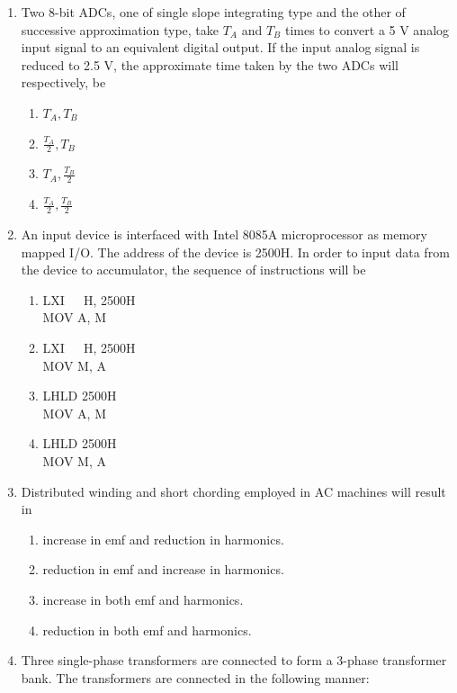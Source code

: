 \documentclass[journal]{IEEEtran}
\begin{document}
\begin{enumerate}
\begin{enumerate}
 \end{enumerate}
\item Two 8-bit ADCs, one of single slope integrating type and the other of successive approximation type, take $T_A$ and $T_B$ times to convert a 5 V analog input signal to an equivalent digital output. If the input analog signal is reduced to 2.5 V, the approximate time taken by the two ADCs will respectively, be
\begin{enumerate}
     \item $T_A, T_B$
     \item $\frac{T_A}{2}, T_B$
     \item $T_A, \frac{T_B}{2}$
     \item $\frac{T_A}{2}, \frac{T_B}{2}$ \\
 \end{enumerate}
\item An input device is interfaced with Intel 8085A microprocessor as memory mapped I/O. The address of the device is 2500H. In order to input data from the device to accumulator, the sequence of instructions will be
\begin{enumerate}
    \item LXI\ \ \ H, 2500H \\
    MOV A, M
    \item LXI\ \ \ H, 2500H \\
    MOV M, A
    \item LHLD 2500H \\
    MOV A, M
    \item LHLD 2500H \\
    MOV M, A \\
\end{enumerate}
\item Distributed winding and short chording employed in AC machines will result in
\begin{enumerate}
    \item increase in emf and reduction in harmonics.
    \item reduction in emf and increase in harmonics.
    \item increase in both emf and harmonics.
    \item reduction in both emf and harmonics. \\
\end{enumerate}
\item Three single-phase transformers are connected to form a 3-phase transformer bank. The transformers are connected in the following manner:\\

\end{enumerate}
\end{document}
